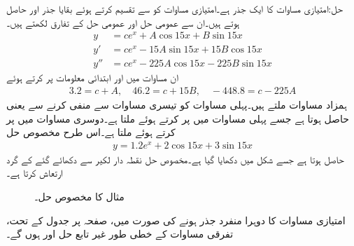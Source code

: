حل:امتیازی مساوات  کا ایک جذر  ہے۔امتیازی مساوات کو  سے تقسیم کرتے ہوئے بقایا جذر  اور  حاصل ہوتے ہیں۔ان سے عمومی حل اور عمومی حل کے تفارق لکھتے ہیں۔
\begin{align*}
y&=ce^{x}+A\cos 15x+B\sin 15x\\
y'&=ce^{x}-15A\sin 15x+15B\cos 15x\\
y''&=ce^{x}-225A\cos 15x-225B\sin 15x
\end{align*} 
ان مساوات میں  اور ابتدائی معلومات پر کرتے ہوئے
\begin{align*}
3.2=c+A,\quad 46.2=c+15B, \quad -448.8=c-225A
\end{align*}
ہمزاد مساوات ملتے ہیں۔پہلی مساوات کو تیسری مساوات سے منفی کرنے سے  یعنی  حاصل ہوتا ہے جسے پہلی مساوات میں پر کرتے ہوئے  ملتا ہے۔دوسری مساوات میں  پر کرتے ہوئے  ملتا ہے۔اس طرح مخصوص حل
\begin{align*}
y=1.2e^x+2\cos 15x+3\sin 15x
\end{align*}
حاصل ہوتا ہے جسے شکل  میں دکھایا گیا ہے۔مخصوص حل نقطہ دار لکیر سے دکھائے گئے  کے گرد ارتعاش کرتا ہے۔
%
\begin{figure}
\centering
{}
\caption{مثال  کا مخصوص حل۔}
\label{شکل_مثال_سادہ_بلند_منفرد_مخلوط_جذر}
\end{figure}

امتیازی مساوات کا دوہرا منفرد جذر  ہونے کی صورت میں، صفحہ  پر  جدول  کے تحت، تفرقی مساوات کے خطی طور غیر تابع حل  اور   ہوں گے۔ 

